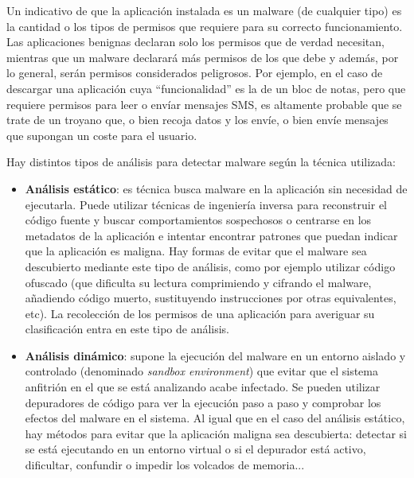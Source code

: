 Un indicativo de que la aplicación instalada es un malware (de cualquier tipo) es la cantidad o los tipos de permisos que requiere para su correcto funcionamiento. Las aplicaciones benignas declaran solo los permisos que de verdad necesitan, mientras que un malware declarará más permisos de los que debe y además, por lo general, serán permisos considerados peligrosos. Por ejemplo, en el caso de descargar una aplicación cuya ``funcionalidad'' es la de un bloc de notas, pero que requiere permisos para leer o envíar mensajes SMS, es altamente probable que se trate de un troyano que, o bien recoja datos y los envíe, o bien envíe mensajes que supongan un coste para el usuario.

Hay distintos tipos de análisis para detectar malware según la técnica utilizada:

\begin{itemize}
	\item \textbf{Análisis estático}: es técnica busca malware en la aplicación sin necesidad de ejecutarla. Puede utilizar técnicas de ingeniería inversa para reconstruir el código fuente y buscar comportamientos sospechosos o centrarse en los metadatos de la aplicación e intentar encontrar patrones que puedan indicar que la aplicación es maligna. Hay formas de evitar que el malware sea descubierto mediante este tipo de análisis, como por ejemplo utilizar código ofuscado (que dificulta su lectura comprimiendo y cifrando el malware, añadiendo código muerto, sustituyendo instrucciones por otras equivalentes, etc). La recolección de los permisos de una aplicación para averiguar su clasificación entra en este tipo de análisis.
	\item \textbf{Análisis dinámico}: supone la ejecución del malware en un entorno aislado y controlado (denominado \textit{sandbox environment}) que evitar que el sistema anfitrión en el que se está analizando acabe infectado. Se pueden utilizar depuradores de código para ver la ejecución paso a paso y comprobar los efectos del malware en el sistema. Al igual que en el caso del análisis estático, hay métodos para evitar que la aplicación maligna sea descubierta: detectar si se está ejecutando en un entorno virtual o si el depurador está activo, dificultar, confundir o impedir los volcados de memoria...
\end{itemize}



















